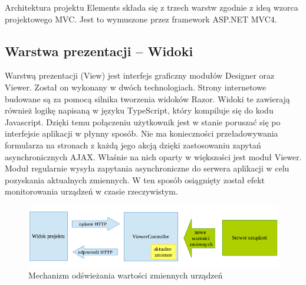 Architektura projektu Elements składa się z trzech warstw zgodnie z ideą wzorca projektowego MVC. Jest to wymuszone przez framework ASP.NET MVC4. 

\subsection{Warstwa prezentacji -- Widoki}
Warstwą prezentacji (View) jest interfejs graficzny modułów Designer oraz Viewer. Został on wykonany w dwóch technologiach. Strony internetowe budowane są za pomocą silnika tworzenia widoków Razor. Widoki te zawierają również logikę napisaną w języku TypeScript, który kompiluje się do kodu Javascript. Dzięki temu połączeniu użytkownik jest w stanie poruszać się po interfejsie aplikacji w płynny sposób. Nie ma konieczności przeładowywania formularza na stronach z każdą jego akcją dzięki zastosowaniu zapytań asynchronicznych AJAX. Właśnie na nich oparty w większości jest moduł Viewer. Moduł regularnie wysyła zapytania asynchroniczne do serwera aplikacji w celu pozyskania aktualnych zmiennych. W ten sposób osiągnięty został efekt monitorowania urządzeń w czasie rzeczywistym.

\begin{figure}[h]
\centerline{
	\includegraphics[width=170mm]{./img/viewer.png}
}
	\caption{Mechanizm odświeżania wartości zmiennych urządzeń}
	\label{fig:viewer}
\end{figure}

